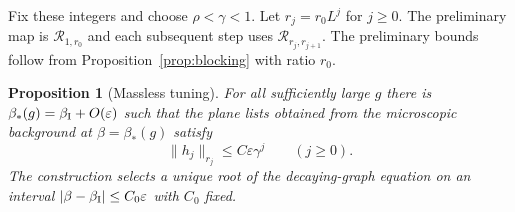\documentclass[11pt]{article}
\newtheorem{proposition}{Proposition}[section]
\theoremstyle{definition}
\begin{document}
Fix these integers and choose \(\rho<\gamma<1\). Let
\(r_j=r_0L^j\) for \(j\ge0\). The preliminary map is
\(\mathcal R_{1,r_0}\) and each subsequent step uses
\(\mathcal R_{r_j,r_{j+1}}\). The preliminary bounds follow from
Proposition~\ref{prop:blocking} with ratio \(r_0\).

\begin{proposition}[Massless tuning]\label{prop:tuning}
For all sufficiently large \(g\) there is
\(\beta_*(g)=\beta_{\rm I}+O(\varepsilon)\) such that the plane lists
obtained from the microscopic background at \(\beta=\beta_*(g)\) satisfy
\begin{equation}
 \|h_j\|_{r_j}\le C\varepsilon\gamma^j\qquad(j\ge0).
 \label{eq:decay-background}
\end{equation}
The construction selects a unique root of the decaying-graph
equation on an interval \(|\beta-\beta_{\rm I}|\le C_0\varepsilon\)
with \(C_0\) fixed.
\end{proposition}
\end{document}
